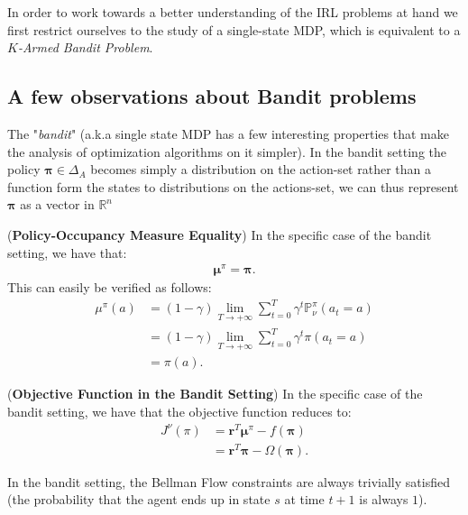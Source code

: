 In order to work towards a better understanding of the IRL problems at hand we first restrict ourselves to the study of a single-state MDP, which is equivalent to a \textit{$K$-Armed Bandit Problem}. 

\subsection{A few observations about Bandit problems}

The "\textit{bandit}" (a.k.a single state MDP has a few interesting properties that make the analysis of optimization algorithms on it simpler). In the bandit setting the policy $\bm{\pi} \in \Delta_A$ becomes simply a distribution on the action-set rather than a function form the states to distributions on the actions-set, we can thus represent $\bm{\pi}$ as a vector in $\mathbb{R}^n$

\begin{observation}
    (\textbf{Policy-Occupancy Measure Equality}) In the specific case of the bandit setting, we have that:
    \begin{align*}
        \bm{\mu}^\pi = \bm{\pi}.
    \end{align*}
    This can easily be verified as follows:
    \begin{align*}
        \mu^\pi(a) &= (1-\gamma) \lim_{T \rightarrow + \infty} \sum_{t=0}^T \gamma^t \mathbb{P}_\nu^\pi(a_t=a) 
        \\
        &= (1-\gamma) \lim_{T \rightarrow + \infty} \sum_{t=0}^T \gamma^t \pi(a_t=a) \\
        &= \pi(a).
    \end{align*}
\end{observation}

\begin{observation}
    (\textbf{Objective Function in the Bandit Setting}) In the specific case of the bandit setting, we have that the objective function reduces to:
    \begin{align*}
        J^\nu(\pi) &= \bm{r}^T \bm{\mu}^\pi -f(\bm{\pi})\\
        &= \bm{r}^T \bm{\pi} - \Omega(\bm{\pi}).
    \end{align*}
\end{observation}

\begin{observation}
    In the bandit setting, the Bellman Flow constraints are always trivially satisfied (the probability that the agent ends up in state $s$ at time $t+1$ is always $1$). 
\end{observation}

